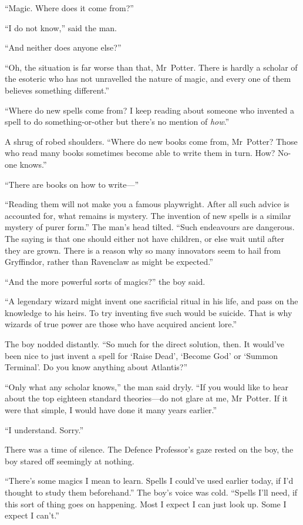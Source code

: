 “Magic. Where does it come from?”

“I do not know,” said the man.

“And neither does anyone else?”

“Oh, the situation is far worse than that, Mr~Potter. There is hardly a scholar of the esoteric who has not unravelled the nature of magic, and every one of them believes something different.”

“Where do new spells come from? I keep reading about someone who invented a spell to do something-or-other but there’s no mention of \emph{how}.”

A shrug of robed shoulders.
“Where do new books come from, Mr~Potter? Those who read many books sometimes become able to write them in turn. How? No-one knows.”

“There are books on how to write—”

“Reading them will not make you a famous playwright. After all such advice is accounted for, what remains is mystery. The invention of new spells is a similar mystery of purer form.” The man’s head tilted.
“Such endeavours are dangerous. The saying is that one should either not have children, or else wait until after they are grown. There is a reason why so many innovators seem to hail from Gryffindor, rather than Ravenclaw as might be expected.”

“And the more powerful sorts of magics?” the boy said.

“A legendary wizard might invent one sacrificial ritual in his life, and pass on the knowledge to his heirs. To try inventing five such would be suicide. That is why wizards of true power are those who have acquired ancient lore.”

The boy nodded distantly.
“So much for the direct solution, then. It would’ve been nice to just invent a spell for ‘Raise Dead’, ‘Become God’ or ‘Summon Terminal’. Do you know anything about Atlantis?”

“Only what any scholar knows,” the man said dryly.
“If you would like to hear about the top eighteen standard theories—do not glare at me, Mr~Potter. If it were that simple, I would have done it many years earlier.”

“I understand. Sorry.”

There was a time of silence. The Defence Professor’s gaze rested on the boy, the boy stared off seemingly at nothing.

“There’s some magics I mean to learn. Spells I could’ve used earlier today, if I’d thought to study them beforehand.” The boy’s voice was cold.
“Spells I’ll need, if this sort of thing goes on happening. Most I expect I can just look up. Some I expect I can’t.”

